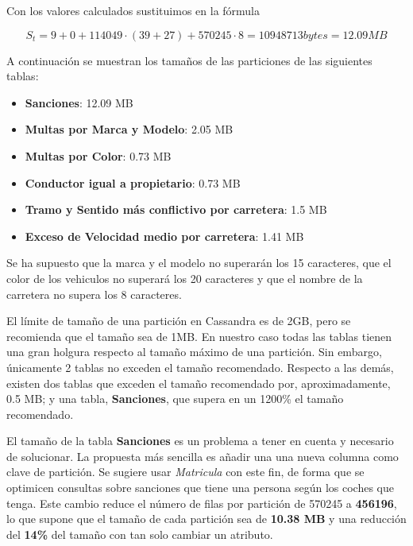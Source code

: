 \documentclass[]{article}
\begin{document}
Con los valores calculados sustituimos en la fórmula 

$$S_t = 9 + 0 + 114049 \cdot (39 + 27) + 570245 \cdot 8 = 10948713 bytes = 12.09 MB$$

A continuación se muestran los tamaños de las particiones de las siguientes tablas:
\begin{itemize}
    \item \textbf{Sanciones}: 12.09 MB
    \item \textbf{Multas por Marca y Modelo}: 2.05 MB
    \item \textbf{Multas por Color}: 0.73 MB
    \item \textbf{Conductor igual a propietario}: 0.73 MB
    \item \textbf{Tramo y Sentido más conflictivo por carretera}: 1.5 MB
    \item \textbf{Exceso de Velocidad medio por carretera}: 1.41 MB
\end{itemize}

Se ha supuesto que la marca y el modelo no superarán los 15 caracteres, que el
color de los vehiculos no superará los 20 caracteres y que el nombre de la
carretera no supera los 8 caracteres.

El límite de tamaño de una partición en Cassandra es de 2GB, pero se recomienda
que el tamaño sea de 1MB. En nuestro caso todas las tablas tienen una gran
holgura respecto al tamaño máximo de una partición. Sin embargo, únicamente 2
tablas no exceden el tamaño recomendado. Respecto a las demás, existen dos tablas que exceden el tamaño
recomendado por, aproximadamente, 0.5 MB; y una tabla, \textbf{Sanciones},
que supera en un 1200\% el tamaño recomendado.

El tamaño de la tabla \textbf{Sanciones} es un problema a tener en cuenta y
necesario de solucionar. La propuesta más sencilla es añadir una una nueva
columna como clave de partición. Se sugiere usar \textit{Matricula} con este
fin, de forma que se optimicen consultas sobre sanciones que tiene una persona
según los coches que tenga. Este cambio reduce el número de filas por partición
de 570245 a \textbf{456196}, lo que supone que el tamaño de cada partición sea
de \textbf{10.38 MB} y una reducción del \textbf{14\%} del tamaño
con tan solo cambiar un atributo.
\end{document}

